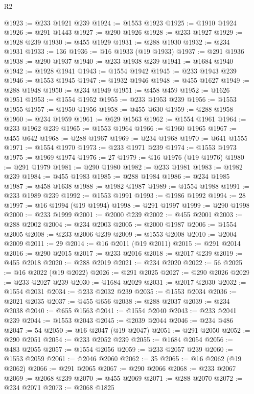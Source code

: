 \begin{lexlean}{R2}
\begin{coremodule}
@1923 := @233 @1921 @239
@1924 := @1553 @1923
@1925 := @1910 @1924
@1926 := @291 @1443
@1927 := @290 @1926
@1928 := @233 @1927
@1929 := @1928 @239
@1930 := @455 @1929
@1931 := @288 @1930
@1932 := @234 @1931
@1933 := 136
@1936 := @16 @1933 (@19 @1933)
@1937 := @291 @1936
@1938 := @290 @1937
@1940 := @233 @1938 @239
@1941 := @1684 @1940
@1942 := @1928 @1941
@1943 := @1554 @1942
@1945 := @233 @1943 @239
@1946 := @1553 @1945
@1947 := @1932 @1946
@1948 := @455 @1627
@1949 := @288 @1948
@1950 := @234 @1949
@1951 := @458 @459
@1952 := @1626 @1951
@1953 := @1554 @1952
@1955 := @233 @1953 @239
@1956 := @1553 @1955
@1957 := @1950 @1956
@1958 := @455 @630
@1959 := @288 @1958
@1960 := @234 @1959
@1961 := @629 @1563
@1962 := @1554 @1961
@1964 := @233 @1962 @239
@1965 := @1553 @1964
@1966 := @1960 @1965
@1967 := @455 @642
@1968 := @288 @1967
@1969 := @234 @1968
@1970 := @641 @1555
@1971 := @1554 @1970
@1973 := @233 @1971 @239
@1974 := @1553 @1973
@1975 := @1969 @1974
@1976 := 27
@1979 := @16 @1976 (@19 @1976)
@1980 := @291 @1979
@1981 := @290 @1980
@1982 := @233 @1981
@1983 := @1982 @239
@1984 := @455 @1983
@1985 := @288 @1984
@1986 := @234 @1985
@1987 := @458 @1638
@1988 := @1982 @1987
@1989 := @1554 @1988
@1991 := @233 @1989 @239
@1992 := @1553 @1991
@1993 := @1986 @1992
@1994 := 28
@1997 := @16 @1994 (@19 @1994)
@1998 := @291 @1997
@1999 := @290 @1998
@2000 := @233 @1999
@2001 := @2000 @239
@2002 := @455 @2001
@2003 := @288 @2002
@2004 := @234 @2003
@2005 := @2000 @1987
@2006 := @1554 @2005
@2008 := @233 @2006 @239
@2009 := @1553 @2008
@2010 := @2004 @2009
@2011 := 29
@2014 := @16 @2011 (@19 @2011)
@2015 := @291 @2014
@2016 := @290 @2015
@2017 := @233 @2016
@2018 := @2017 @239
@2019 := @455 @2018
@2020 := @288 @2019
@2021 := @234 @2020
@2022 := 56
@2025 := @16 @2022 (@19 @2022)
@2026 := @291 @2025
@2027 := @290 @2026
@2029 := @233 @2027 @239
@2030 := @1684 @2029
@2031 := @2017 @2030
@2032 := @1554 @2031
@2034 := @233 @2032 @239
@2035 := @1553 @2034
@2036 := @2021 @2035
@2037 := @455 @656
@2038 := @288 @2037
@2039 := @234 @2038
@2040 := @655 @1563
@2041 := @1554 @2040
@2043 := @233 @2041 @239
@2044 := @1553 @2043
@2045 := @2039 @2044
@2046 := @234 @486
@2047 := 54
@2050 := @16 @2047 (@19 @2047)
@2051 := @291 @2050
@2052 := @290 @2051
@2054 := @233 @2052 @239
@2055 := @1684 @2054
@2056 := @483 @2055
@2057 := @1554 @2056
@2059 := @233 @2057 @239
@2060 := @1553 @2059
@2061 := @2046 @2060
@2062 := 35
@2065 := @16 @2062 (@19 @2062)
@2066 := @291 @2065
@2067 := @290 @2066
@2068 := @233 @2067
@2069 := @2068 @239
@2070 := @455 @2069
@2071 := @288 @2070
@2072 := @234 @2071
@2073 := @2068 @1825

\end{coremodule}
\end{lexlean}
